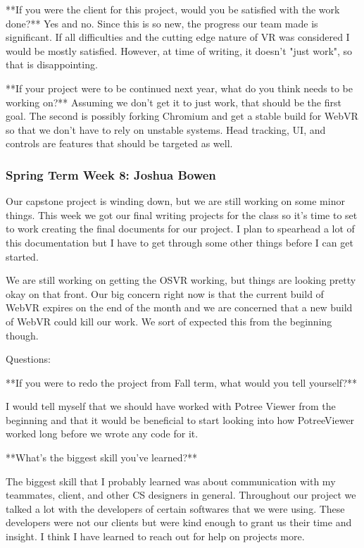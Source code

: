 \documentclass[draftclsnofoot,onecolumn]{IEEEtran}
\begin{document}
**If you were the client for this project, would you be satisfied with the work done?**
Yes and no. Since this is so new, the progress our team made is significant. If all difficulties and the cutting edge nature of VR was considered I would be mostly satisfied. However, at time of writing, it doesn't "just work", so that is disappointing. 

**If your project were to be continued next year, what do you think needs to be working on?**
Assuming we don't get it to just work, that should be the first goal. The second is possibly forking Chromium and get a stable build for WebVR so that we don't have to rely on unstable systems. Head tracking, UI, and controls are features that should be targeted as well.

\subsubsection{Spring Term Week 8: Joshua Bowen}

Our capstone project is winding down, but we are still working on some minor things. This week we got our final writing projects for the class so it's time to set to work creating the final documents for our project. I plan to spearhead a lot of this documentation but I have to get through some other things before I can get started.

We are still working on getting the OSVR working, but things are looking pretty okay on that front. Our big concern right now is that the current build of WebVR expires on the end of the month and we are concerned that a new build of WebVR could kill our work. We sort of expected this from the beginning though.

Questions:

**If you were to redo the project from Fall term, what would you tell yourself?**

I would tell myself that we should have worked with Potree Viewer from the beginning and that it would be beneficial to start looking into how PotreeViewer worked long before we wrote any code for it.

**What's the biggest skill you've learned?**

The biggest skill that I probably learned was about communication with my teammates, client, and other CS designers in general. Throughout our project we talked a lot with the developers of certain softwares that we were using. These developers were not our clients but were kind enough to grant us their time and insight. I think I have learned to reach out for help on projects more.
\end{document}

